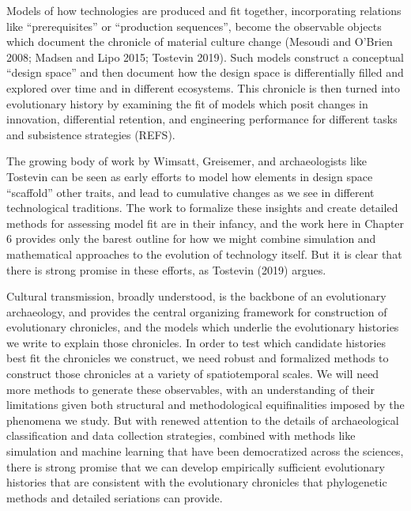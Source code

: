 Models of how technologies are produced and fit together, incorporating relations like “prerequisites” or “production sequences”, become the observable objects which document the chronicle of material culture change (Mesoudi and O’Brien 2008; Madsen and Lipo 2015; Tostevin 2019).  Such models construct a conceptual “design space” and then document how the design space is differentially filled and explored over time and in different ecosystems.  This chronicle is then turned into evolutionary history by examining the fit of models which posit changes in innovation, differential retention, and engineering performance for different tasks and subsistence strategies (REFS).  

The growing body of work by Wimsatt, Greisemer, and archaeologists like Tostevin can be seen as early efforts to model how elements in design space “scaffold” other traits, and lead to cumulative changes as we see in different technological traditions.  The work to formalize these insights and create detailed methods for assessing model fit are in their infancy, and the work here in Chapter 6 provides only the barest outline for how we might combine simulation and mathematical approaches to the evolution of technology itself.  But it is clear that there is strong promise in these efforts, as Tostevin (2019) argues.  

Cultural transmission, broadly understood, is the backbone of an evolutionary archaeology, and provides the central organizing framework for construction of evolutionary chronicles, and the models which underlie the evolutionary histories we write to explain those chronicles.  In order to test which candidate histories best fit the chronicles we construct, we need robust and formalized methods to construct those chronicles at a variety of spatiotemporal scales.  We will need more methods to generate these observables, with an understanding of their limitations given both structural and methodological equifinalities imposed by the phenomena we study.   But with renewed attention to the details of archaeological classification and data collection strategies, combined with methods like simulation and machine learning that have been democratized across the sciences, there is strong promise that we can develop empirically sufficient evolutionary histories that are consistent with the evolutionary chronicles that phylogenetic methods and detailed seriations can provide.  


